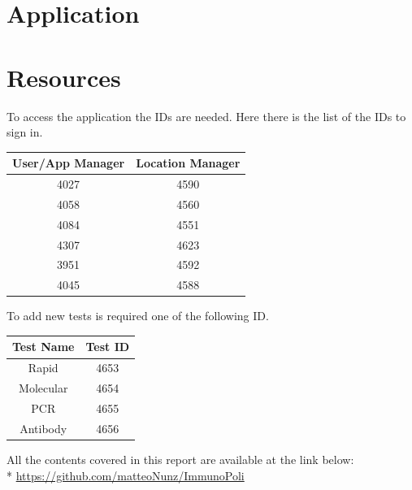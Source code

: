 \documentclass[a4paper, 12p]{article}
\newcommand{\link}[1]{{\color{blue}\href{#1}{#1}}}
\begin{document}
\section{Application}

\newpage
\section{Resources}
To access the application the IDs are needed. Here there is the list of the IDs to sign in.
\begin{center}
        {\begin{tabular}{|c|c|}
        \hline
        User/App Manager & Location Manager \\*
        \hline
        4027 & 4590 \\*
        4058 & 4560 \\*
        4084 & 4551 \\*
        4307 & 4623 \\*
        3951 & 4592 \\*
        4045 & 4588 \\*
        \hline
        \end{tabular}}
\end{center}

\noindent
To add new tests is required one of the following ID.
\begin{center}
    {\begin{tabular}{|c|c|}
    \hline
    Test Name & Test ID \\*
    \hline
    Rapid & 4653 \\*
    Molecular & 4654 \\*
    PCR & 4655 \\*
    Antibody & 4656 \\*
    \hline
    \end{tabular}}
\end{center}

\noindent
All the contents covered in this report are available at the link below:\\* \link{https://github.com/matteoNunz/ImmunoPoli}
\end{document}

